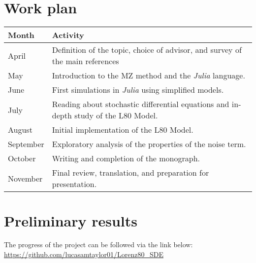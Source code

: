\documentclass[12pt]{article}
\begin{document}
\section*{Work plan}
\begin{center}
	\renewcommand{\arraystretch}{1.5}
	\begin{tabular}{p{3cm}p{10cm}}
		\toprule
		        
		\textbf{Month} & \textbf{Activity}                                                                    \\
		\midrule
		April          & Definition of the topic, choice of advisor, and survey of the main references        \\
		May            & Introduction to the MZ method and the \textit{Julia} language.                       \\
		June           & First simulations in \textit{Julia} using simplified models.                         \\
		        
		July           & Reading about stochastic differential equations and in-depth study of the L80 Model. \\
		August         & Initial implementation of the L80 Model.                                             \\
		September      & Exploratory analysis of the properties of the noise term.                            \\
		        
		October        & Writing and completion of the monograph.                                             \\
		November       & Final review, translation, and preparation for presentation.                         \\
		\bottomrule
	\end{tabular}
\end{center}
\section*{Preliminary results}
The progress of the project can be followed via the link below:
\url{https://github.com/lucasamtaylor01/Lorenz80_SDE}
\newpage
\nocite{*}
\printbibliography[title={References}, label={sec:bib}]
\end{document}
